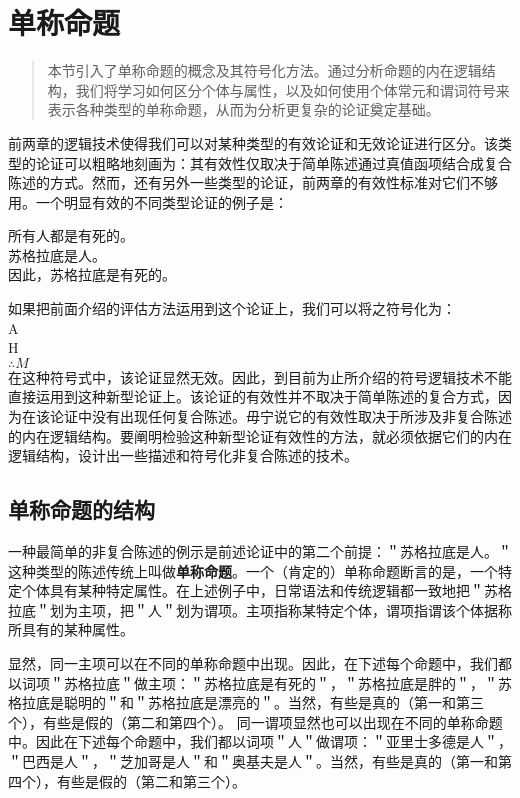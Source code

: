 \section{单称命题}

\begin{quotation}
本节引入了单称命题的概念及其符号化方法。通过分析命题的内在逻辑结构，我们将学习如何区分个体与属性，以及如何使用个体常元和谓词符号来表示各种类型的单称命题，从而为分析更复杂的论证奠定基础。
\end{quotation}

前两章的逻辑技术使得我们可以对某种类型的有效论证和无效论证进行区分。该类型的论证可以粗略地刻画为：其有效性仅取决于简单陈述通过真值函项结合成复合陈述的方式。然而，还有另外一些类型的论证，前两章的有效性标准对它们不够用。一个明显有效的不同类型论证的例子是：

所有人都是有死的。\\
苏格拉底是人。\\
因此，苏格拉底是有死的。

如果把前面介绍的评估方法运用到这个论证上，我们可以将之符号化为：\\
A\\
H\\
$\therefore M$\\
在这种符号式中，该论证显然无效。因此，到目前为止所介绍的符号逻辑技术不能直接运用到这种新型论证上。该论证的有效性并不取决于简单陈述的复合方式，因为在该论证中没有出现任何复合陈述。毋宁说它的有效性取决于所涉及非复合陈述的内在逻辑结构。要阐明检验这种新型论证有效性的方法，就必须依据它们的内在逻辑结构，设计出一些描述和符号化非复合陈述的技术。

\subsection{单称命题的结构}

一种最简单的非复合陈述的例示是前述论证中的第二个前提：＂苏格拉底是人。＂这种类型的陈述传统上叫做\textbf{单称命题}。一个（肯定的）单称命题断言的是，一个特定个体具有某种特定属性。在上述例子中，日常语法和传统逻辑都一致地把＂苏格拉底＂划为主项，把＂人＂划为谓项。主项指称某特定个体，谓项指谓该个体据称所具有的某种属性。

显然，同一主项可以在不同的单称命题中出现。因此，在下述每个命题中，我们都以词项＂苏格拉底＂做主项：＂苏格拉底是有死的＂，＂苏格拉底是胖的＂，＂苏格拉底是聪明的＂和＂苏格拉底是漂亮的＂。当然，有些是真的（第一和第三个），有些是假的（第二和第四个）。\cite{quine1953} 同一谓项显然也可以出现在不同的单称命题中。因此在下述每个命题中，我们都以词项＂人＂做谓项：＂亚里士多德是人＂，＂巴西是人＂，＂芝加哥是人＂和＂奥基夫是人＂。当然，有些是真的（第一和第四个），有些是假的（第二和第三个）。

